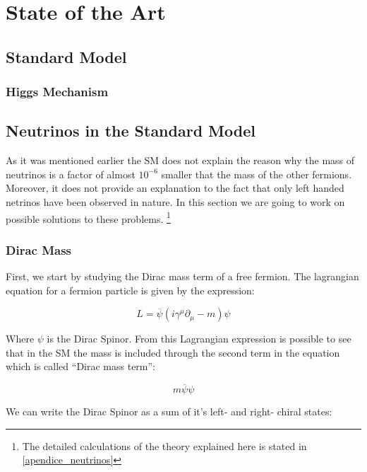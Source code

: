\chapter{State of the Art} 

\section{Standard Model}

\subsection{Higgs Mechanism}

\section{Neutrinos in the Standard Model}

As it was mentioned earlier the SM does not explain the reason why the mass of neutrinos is a factor of almost $10^{-6}$ smaller that the mass of the other fermions. Moreover, it does not
provide an explanation to the fact that only left handed netrinos have been observed in nature. 
In this section we are going to work on possible solutions to these problems. \footnote{The detailed calculations of the theory explained here is stated in \ref{apendice_neutrinos}}

\subsection{Dirac Mass}

First, we start by studying the Dirac mass term of a free fermion. The lagrangian equation for a fermion particle is given by the expression:

\begin{equation}
 L = \overline{\psi} \left( i \gamma ^\mu \partial_{\mu} - m \right) \psi
\end{equation}

Where $\psi$ is the Dirac Spinor. From this Lagrangian expression is possible to see that in the SM the mass is included through the second term in the equation which is called ``Dirac mass term'':

\begin{equation}
 m \overline{\psi} \psi
\end{equation}

We can write the Dirac Spinor as a sum of it's left- and right- chiral states:

